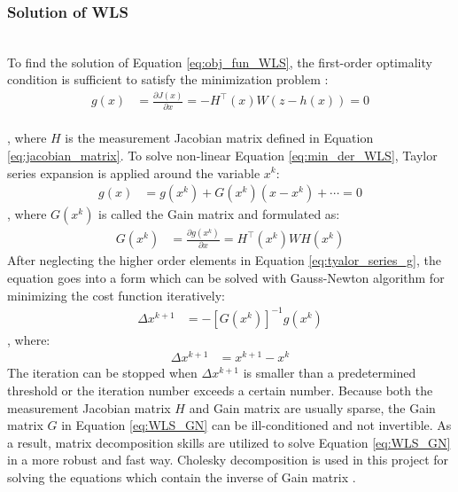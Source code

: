\subsubsection{Solution of WLS}
\\To find the solution of Equation \ref{eq:obj_fun_WLS}, the first-order optimality condition is sufficient to satisfy the minimization problem \cite{gomez2004power}:
\begin{align}
    g(x) &= \frac{\partial J(x)}{\partial x} 
          = -H^\intercal(x) W (z-h(x))
          =0
    \label{eq:min_der_WLS}      
\end{align}
\\, where $H$ is the measurement Jacobian matrix defined in Equation \ref{eq:jacobian_matrix}. To solve non-linear Equation \ref{eq:min_der_WLS}, Taylor series expansion is applied around the variable $x^k$:
\begin{align}
    g(x) &= g(x^k)+G(x^k)(x-x^k)+\cdots =0
    \label{eq:tyalor_series_g}
\end{align}
, where $G(x^k)$ is called the Gain matrix and formulated as:
\begin{align}
    G(x^k) &= \frac{\partial g(x^k)}{\partial x}
    =H^\intercal(x^k) W H(x^k )
    \label{eq:gain_matrix}
\end{align}
After neglecting the higher order elements in Equation \ref{eq:tyalor_series_g}, the equation goes into a form which can be solved with Gauss-Newton algorithm for minimizing the cost function iteratively:
\begin{align}
     \Delta x^{k+1} &= -[G(x^k)]^{-1} g(x^k)
    \label{eq:WLS_GN}
\end{align}
, where:
\begin{align}
     \Delta x^{k+1} &= x^{k+1}-x^k
    \label{eq:delta_x}
\end{align}
The iteration can be stopped when $\Delta x^{k+1}$ is smaller than a predetermined threshold or the iteration number exceeds a certain number. Because both the measurement Jacobian matrix $H$ and Gain matrix are usually sparse, the Gain matrix $G$ in Equation \ref{eq:WLS_GN} can be ill-conditioned and not invertible. As a result, matrix decomposition skills are utilized to solve Equation \ref{eq:WLS_GN} in a more robust and fast way. Cholesky decomposition is used in this project for solving the equations which contain the inverse of Gain matrix \cite{gomez2004power}. 


